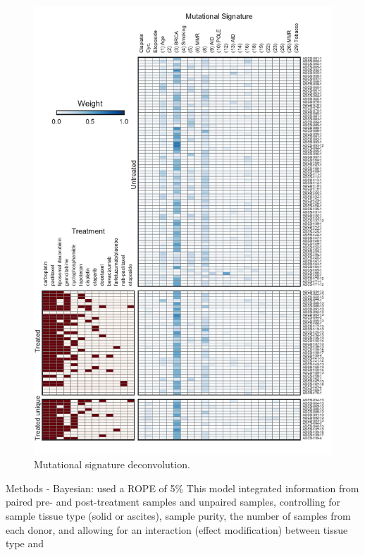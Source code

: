 \begin{figure}
\centering
\includegraphics[scale=1.0]{figures/signatures.pdf}
\caption{Mutational signature deconvolution. }
\label{fig:signatures}
\end{figure}


Methods
 - Bayesian: used a ROPE of 5\%
 This model integrated information from paired pre- and post-treatment samples and unpaired samples, controlling for sample tissue type (solid or ascites), sample purity, the number of samples from each donor, and allowing for an interaction (effect modification) between tissue type and 

